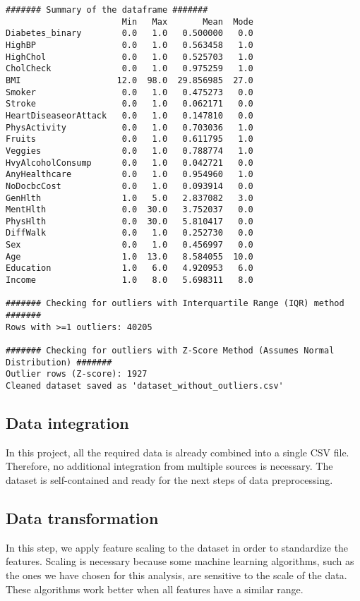 \begin{lstlisting}
####### Summary of the dataframe #######
                       Min   Max       Mean  Mode
Diabetes_binary        0.0   1.0   0.500000   0.0
HighBP                 0.0   1.0   0.563458   1.0
HighChol               0.0   1.0   0.525703   1.0
CholCheck              0.0   1.0   0.975259   1.0
BMI                   12.0  98.0  29.856985  27.0
Smoker                 0.0   1.0   0.475273   0.0
Stroke                 0.0   1.0   0.062171   0.0
HeartDiseaseorAttack   0.0   1.0   0.147810   0.0
PhysActivity           0.0   1.0   0.703036   1.0
Fruits                 0.0   1.0   0.611795   1.0
Veggies                0.0   1.0   0.788774   1.0
HvyAlcoholConsump      0.0   1.0   0.042721   0.0
AnyHealthcare          0.0   1.0   0.954960   1.0
NoDocbcCost            0.0   1.0   0.093914   0.0
GenHlth                1.0   5.0   2.837082   3.0
MentHlth               0.0  30.0   3.752037   0.0
PhysHlth               0.0  30.0   5.810417   0.0
DiffWalk               0.0   1.0   0.252730   0.0
Sex                    0.0   1.0   0.456997   0.0
Age                    1.0  13.0   8.584055  10.0
Education              1.0   6.0   4.920953   6.0
Income                 1.0   8.0   5.698311   8.0

####### Checking for outliers with Interquartile Range (IQR) method #######
Rows with >=1 outliers: 40205

####### Checking for outliers with Z-Score Method (Assumes Normal Distribution) #######
Outlier rows (Z-score): 1927
Cleaned dataset saved as 'dataset_without_outliers.csv'
\end{lstlisting}

\subsection{Data integration}
In this project, all the required data is already combined into a single CSV file. Therefore, no additional integration from multiple sources is necessary. The dataset is self-contained and ready for the next steps of data preprocessing.

\subsection{Data transformation}

In this step, we apply feature scaling to the dataset in order to standardize the features. Scaling is necessary because some machine learning algorithms, such as the ones we have chosen for this analysis, are sensitive to the scale of the data. These algorithms work better when all features have a similar range.

